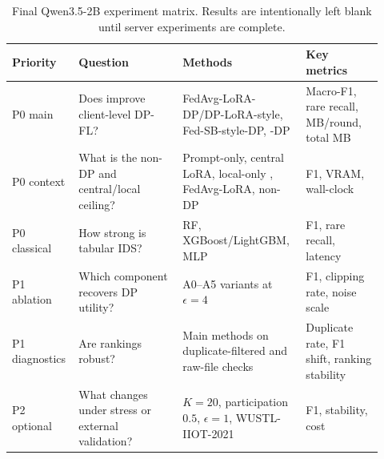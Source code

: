 \begin{table}[t]
\centering
\caption{Final Qwen3.5-2B experiment matrix. Results are intentionally left blank until server experiments are complete.}
\label{tab:experiment_matrix}
\begin{tabular}{p{0.13\linewidth}p{0.27\linewidth}p{0.32\linewidth}p{0.20\linewidth}}
\toprule
Priority & Question & Methods & Key metrics \\
\midrule
P0 main & Does \method{} improve client-level DP-FL? & FedAvg-LoRA-DP/DP-LoRA-style, Fed-SB-style-DP, \method{}-DP & Macro-F1, rare recall, MB/round, total MB \\
P0 context & What is the non-DP and central/local ceiling? & Prompt-only, central LoRA, local-only \core{}, FedAvg-LoRA, \core{} non-DP & F1, VRAM, wall-clock \\
P0 classical & How strong is tabular IDS? & RF, XGBoost/LightGBM, MLP & F1, rare recall, latency \\
P1 ablation & Which component recovers DP utility? & A0--A5 \method{} variants at $\epsilon=4$ & F1, clipping rate, noise scale \\
P1 diagnostics & Are rankings robust? & Main methods on duplicate-filtered and raw-file checks & Duplicate rate, F1 shift, ranking stability \\
P2 optional & What changes under stress or external validation? & $K=20$, participation $0.5$, $\epsilon=1$, WUSTL-IIOT-2021 & F1, stability, cost \\
\bottomrule
\end{tabular}
\end{table}
